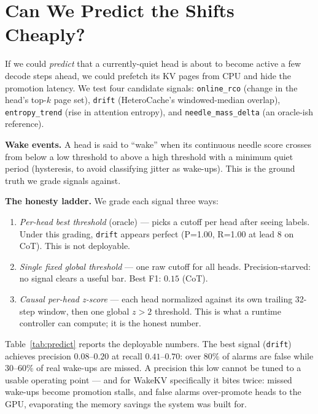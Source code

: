 \documentclass[11pt]{article}
\begin{document}
\section{Can We Predict the Shifts Cheaply?}
\label{sec:predict}

If we could \emph{predict} that a currently-quiet head is about to become
active a few decode steps ahead, we could prefetch its KV pages from CPU
and hide the promotion latency. We test four candidate signals:
\texttt{online\_rco} (change in the head's top-$k$ page set),
\texttt{drift} (HeteroCache's windowed-median overlap), \texttt{entropy\_trend}
(rise in attention entropy), and \texttt{needle\_mass\_delta}
(an oracle-ish reference).

\textbf{Wake events.} A head is said to ``wake'' when its continuous
needle score crosses from below a low threshold to above a high threshold
with a minimum quiet period (hysteresis, to avoid classifying jitter as
wake-ups). This is the ground truth we grade signals against.

\textbf{The honesty ladder.} We grade each signal three ways:

\begin{enumerate}
    \item \emph{Per-head best threshold} (oracle) --- picks a cutoff per
        head after seeing labels. Under this grading, \texttt{drift}
        appears perfect (P=1.00, R=1.00 at lead 8 on CoT). This is not
        deployable.
    \item \emph{Single fixed global threshold} --- one raw cutoff for all
        heads. Precision-starved: no signal clears a useful bar. Best
        F1: $0.15$ (CoT).
    \item \emph{Causal per-head z-score} --- each head normalized against
        its own trailing 32-step window, then one global $z > 2$
        threshold. This is what a runtime controller can compute; it is
        the honest number.
\end{enumerate}

Table~\ref{tab:predict} reports the deployable numbers. The best signal
(\texttt{drift}) achieves precision $0.08$--$0.20$ at recall
$0.41$--$0.70$: over $80\%$ of alarms are false while $30$--$60\%$ of
real wake-ups are missed. A precision this low cannot be tuned to a
usable operating point --- and for WakeKV specifically it bites twice:
missed wake-ups become promotion stalls, and false alarms
over-promote heads to the GPU, evaporating the memory savings the
system was built for.
\end{document}
